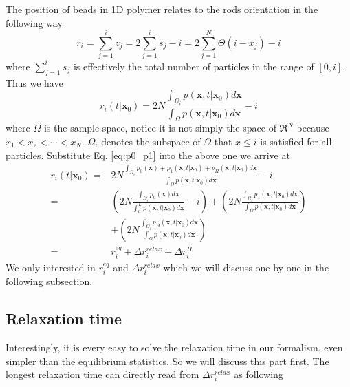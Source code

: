 \documentclass[12pt,a4paper]{article}
\begin{document}
The position of beads in 1D polymer relates to the rods orientation in the
following way
\begin{equation}
    \label{eq:bead_position_sum}
    r_i = \sum_{j=1}^i z_j = 2\sum_{j=1}^i s_j - i = 2\sum_{j=1}^N\Theta(i - x_j)-i
\end{equation}
where $\sum_{j=1}^i s_j$ is effectively the total number of particles in the range
of $[0, i]$. Thus we have 
\begin{equation}
    \label{eq:bead_position_integral}
    r_i(t|\mathbf{x}_0) = 2 N \frac{\int_{\Omega_i} p(\mathbf{x}, t | \mathbf{x}_0)
        d\mathbf{x}}{\int_{\Omega} p(\mathbf{x}, t | \mathbf{x}_0)d\mathbf{x}} - i
\end{equation}
where $\Omega$ is the sample space, notice it is not simply the space of $\Re^N$
because $x_1 < x_2 < \cdots < x_N$. $\Omega_i$ denotes the subspace of $\Omega$
that $x \leqslant i$ is satisfied for all particles. Substitute Eq.
\eqref{eq:p0_p1} into the above one we arrive at
\begin{equation}
\begin{aligned}
    \label{eq:bead_position_substitution}
    r_i(t|\mathbf{x}_0) = & 2 N \frac{\int_{\Omega_i} p_0(\mathbf{x}) + p_1(\mathbf{x},
        t | \mathbf{x}_0) + p_H(\mathbf{x}, t| \mathbf{x}_0)
        d\mathbf{x}}{\int_{\Omega}p(\mathbf{x}, t | \mathbf{x}_0)d\mathbf{x}}-i \\
    = & \left(2N \frac{\int_{\Omega_i} p_0(\mathbf{x})d\mathbf{x}}{\int_0^{L}
            p(\mathbf{x}, t | \mathbf{x}_0)d\mathbf{x}}-i\right) + \left(2N
        \frac{\int_{\Omega_i} p_1(\mathbf{x}, t| \mathbf{x}_0)d\mathbf{x}}
        {\int_{\Omega} p(\mathbf{x}, t | \mathbf{x}_0)d\mathbf{x}}\right)  \\
    & + \left(2N \frac{\int_{\Omega_i} p_H(\mathbf{x}, t|
            \mathbf{x}_0)d\mathbf{x}}{\int_{\Omega} p(\mathbf{x}, t |
            \mathbf{x}_0)d\mathbf{x}}\right) \\
    = & r_i^{eq} + \Delta r_i^{relax} + \Delta r_i^{H}
\end{aligned}
\end{equation}
We only interested in $r_i^{eq}$ and $\Delta r_i^{relax}$ which we will discuss
one by one in the following subsection.

\subsection{Relaxation time}
\label{sub:relaxation_time}
Interestingly, it is every easy to solve the relaxation time in our formalism,
even simpler than the equilibrium statistics. So we will discuss this part
first. The longest relaxation time can directly read from $\Delta r_i^{relax}$ as
following
\end{document}
